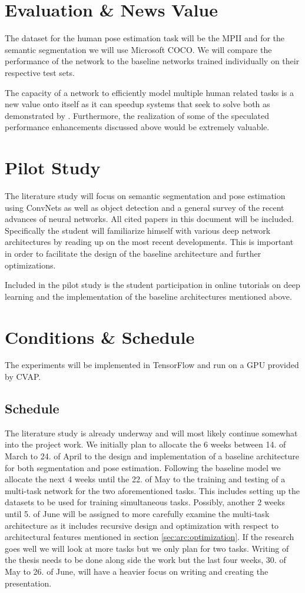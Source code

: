 \documentclass[a4paper,10pt]{article}
\begin{document}
\section{Evaluation \& News Value}
The dataset for the human pose estimation task will be the MPII\cite{Andriluka} and for the semantic segmentation we will use Microsoft COCO\cite{Lin2014}.  We will compare the performance of the network to the baseline networks trained individually on their respective test sets.  

The capacity of a network to efficiently model multiple human related tasks is a new value onto itself as it can speedup systems that seek to solve both as demonstrated by \cite{Ren2015}.  Furthermore, the realization of some of the speculated performance enhancements discussed above would be extremely valuable.

\section{Pilot Study}
The literature study will focus on semantic segmentation and pose estimation using ConvNets as well as object detection and a general survey of the recent advances of neural networks.  All cited papers in this document will be included.  Specifically the student will familiarize himself with various deep network architectures by reading up on the  most recent developments.  This is important in order to facilitate the design of the baseline architecture and further optimizations.

Included in the pilot study is the student participation in online tutorials on deep learning and the implementation of the baseline architectures mentioned above.

 
\section{Conditions \& Schedule}
The experiments will be implemented in TensorFlow\cite{Abadi2015} and run on a GPU provided by CVAP.

\subsection{Schedule}
The literature study is already underway and will most likely continue somewhat into the project work.  We initially plan to allocate the 6 weeks between 14. of March to 24. of April to the design and implementation of a baseline architecture for both segmentation and pose estimation.  Following the baseline model we allocate the next 4 weeks until the 22. of May to the training and testing of a multi-task network for the two aforementioned tasks.  This includes setting up the datasets to be used for training simultaneous tasks.  Possibly, another 2 weeks until 5. of June will be assigned to more carefully examine the multi-task architecture as it includes recursive design and optimization with respect to architectural features mentioned in section \ref{sec:arc:optimization}.  If the research goes well we will look at more tasks but we only plan for two tasks.  Writing of the thesis needs to be done along side the work but the last four weeks, 30. of May to 26. of June, will have a heavier focus on writing and creating the presentation.



\end{document}
